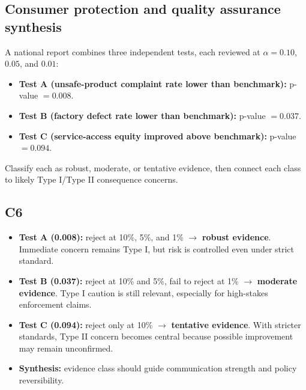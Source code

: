 \begin{ExamProblems}
\item
\section{Consumer protection and quality assurance synthesis}
A national report combines three independent tests, each reviewed at \(\alpha=0.10\), \(0.05\), and \(0.01\):
\begin{itemize}
    \item \textbf{Test A (unsafe-product complaint rate lower than benchmark):} p-value \(=0.008\).
    \item \textbf{Test B (factory defect rate lower than benchmark):} p-value \(=0.037\).
    \item \textbf{Test C (service-access equity improved above benchmark):} p-value \(=0.094\).
\end{itemize}
Classify each as robust, moderate, or tentative evidence, then connect each class to likely Type I/Type II consequence concerns.

\subsection*{C6}
\begin{itemize}
    \item \textbf{Test A (0.008):} reject at 10\%, 5\%, and 1\% $\rightarrow$ \textbf{robust evidence}. Immediate concern remains Type I, but risk is controlled even under strict standard.
    \item \textbf{Test B (0.037):} reject at 10\% and 5\%, fail to reject at 1\% $\rightarrow$ \textbf{moderate evidence}. Type I caution is still relevant, especially for high-stakes enforcement claims.
    \item \textbf{Test C (0.094):} reject only at 10\% $\rightarrow$ \textbf{tentative evidence}. With stricter standards, Type II concern becomes central because possible improvement may remain unconfirmed.
    \item \textbf{Synthesis:} evidence class should guide communication strength and policy reversibility.
\end{itemize}

\item

\end{ExamProblems}
